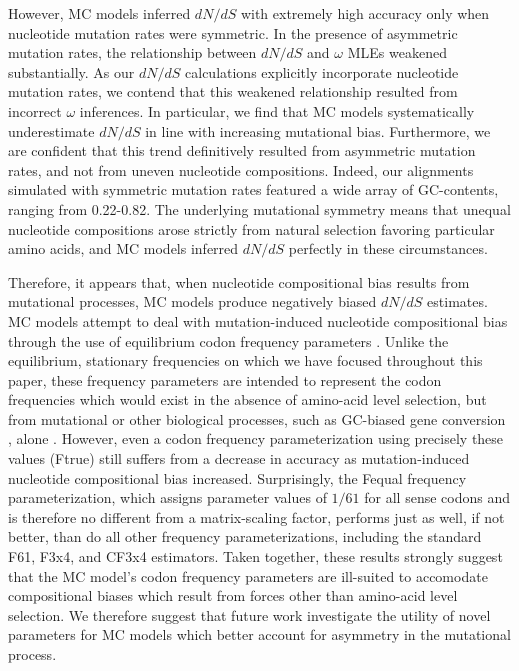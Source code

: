 \documentclass{pnastwo}
\begin{document}
\begin{article}
However, MC models inferred $dN/dS$ with extremely high accuracy only when nucleotide mutation rates were symmetric. In the presence of asymmetric mutation rates, the relationship between $dN/dS$ and $\omega$ MLEs weakened substantially. As our $dN/dS$ calculations explicitly incorporate nucleotide mutation rates, we contend that this weakened relationship resulted from incorrect $\omega$ inferences. In particular, we find that MC models systematically underestimate $dN/dS$ in line with increasing mutational bias. Furthermore, we are confident that this trend definitively resulted from asymmetric mutation rates, and not from uneven nucleotide compositions. Indeed, our alignments simulated with symmetric mutation rates featured a wide array of GC-contents, ranging from 0.22-0.82. The underlying mutational symmetry means that unequal nucleotide compositions arose strictly from natural selection favoring particular amino acids, and MC models inferred $dN/dS$ perfectly in these circumstances.

Therefore, it appears that, when nucleotide compositional bias results from mutational processes, MC models produce negatively biased $dN/dS$ estimates. MC models attempt to deal with mutation-induced nucleotide compositional bias through the use of equilibrium codon frequency parameters \cite{Yang2006}. Unlike the equilibrium, stationary frequencies on which we have focused throughout this paper, these frequency parameters are intended to represent the codon frequencies which would exist in the absence of amino-acid level selection, but from mutational or other biological processes, such as GC-biased gene conversion \cite{DuretGaltier2009,WebsterHurst2012}, alone \cite{GoldmanYang1994,MuseGaut1994,YN00,Yang2006}. However, even a codon frequency parameterization using precisely these values (Ftrue) still suffers from a decrease in accuracy as mutation-induced nucleotide compositional bias increased. Surprisingly, the Fequal frequency parameterization, which assigns parameter values of $1/61$ for all sense codons and is therefore no different from a matrix-scaling factor, performs just as well, if not better, than do all other frequency parameterizations, including the standard F61, F3x4, and CF3x4 estimators. Taken together, these results strongly suggest that the MC model's codon frequency parameters are ill-suited to accomodate compositional biases which result from forces other than amino-acid level selection. We therefore suggest that future work investigate the utility of novel parameters for MC models which better account for asymmetry in the mutational process.


\end{article}
\end{document}
